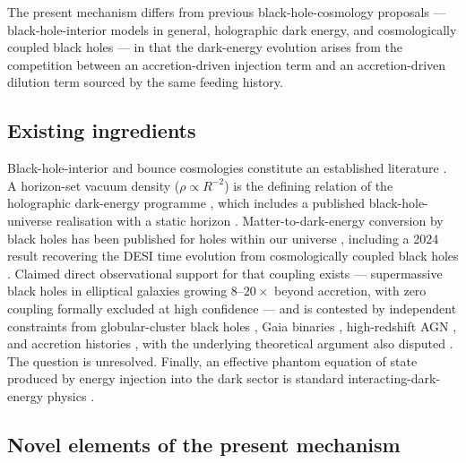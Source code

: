 \documentclass[11pt,a4paper]{article}
\begin{document}
The present mechanism differs from previous black-hole-cosmology proposals --- black-hole-interior models in general, holographic dark energy, and cosmologically coupled black holes --- in that the dark-energy evolution arises from the competition between an accretion-driven injection term and an accretion-driven dilution term sourced by the same feeding history.

\subsection{Existing ingredients}\label{sec:existing}

Black-hole-interior and bounce cosmologies constitute an established literature \citep{Pathria1972,NovelloBergliaffa2008,Poplawski2010}. A horizon-set vacuum density ($\rho\propto R^{-2}$) is the defining relation of the holographic dark-energy programme \citep{CohenKaplanNelson1999,Li2004}, which includes a published black-hole-universe realisation with a static horizon \citep{Gaztanaga2022}. Matter-to-dark-energy conversion by black holes has been published for holes within our universe \citep{CrokerWeiner2019}, including a 2024 result recovering the DESI time evolution from cosmologically coupled black holes \citep{Croker2024}. Claimed direct observational support for that coupling exists --- supermassive black holes in elliptical galaxies growing $8$--$20\times$ beyond accretion, with zero coupling formally excluded at high confidence \citep{Farrah2023growth,Farrah2023coupling} --- and is contested by independent constraints from globular-cluster black holes \citep{Rodriguez2023}, Gaia binaries \citep{AndraeElBadry2023}, high-redshift AGN \citep{Lei2024}, and accretion histories \citep{Lacy2024}, with the underlying theoretical argument also disputed \citep{GaurVisser2024}. The question is unresolved. Finally, an effective phantom equation of state produced by energy injection into the dark sector is standard interacting-dark-energy physics \citep{DasCorasanitiKhoury2006,Wang2016}.

\subsection{Novel elements of the present mechanism}\label{sec:novel}
\end{document}
